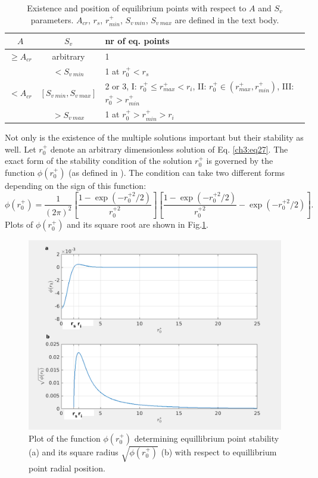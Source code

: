 \documentclass[../main.tex]{subfiles}
\begin{document}
\begin{table}
\small
\tabcolsep=0.2cm
\caption{Existence and position of equilibrium points with respect to $A$ and $S_v$ parameters. $A_{cr}$, $r_s$, $r^+_{min}$, $S_{v\ min}$, $S_{v\ max}$ are defined in the text body.}
\centering
\begin{tabular}{|c|c|l|}
\hline
$A$ & $S_v$ & nr  of eq. points\\
\hline
$\geq A_{cr}$ & arbitrary & 1 \\
\hline
\multirow{3}{*}{$<A_{cr}$} & $<S_{v\ min}$ & 1 at $r^+_0 <r_s$ \\
\multirow{3}{*}{\ } & $[S_{v\ min},S_{v\ max}]$  & 2 or 3, I: $r^+_0\leq r^+_{max}<r_i$, II: $r^+_0 \in (r^+_{max},r^+_{min})$, III: $r^+_0>r^+_{min}$\\
\multirow{3}{*}{\ } & $>S_{v\ max}$  & 1 at $r^+_0>r^+_{min}>r_i$\\
\hline
\end{tabular}
\label{tab:ch3_2b}
\end{table}

Not only is the existence of the multiple solutions important but their stability as well. Let $r^+_0$ denote an arbitrary dimensionless solution of Eq. \ref{ch3:eq27}. The exact form of the stability condition of the solution $r^+_0$ is governed by the function $\phi(r^+_0)$ (as defined in \citet{Marcu1995}). The condition can take two different forms depending on the sign of this function:
\begin{equation}
\phi(r^+_0)=\frac{1}{(2 \pi)^2} \left[\frac{1-\exp(-r^{+ 2}_0/2)}{r^{+ 2}_0} \right] \left[\frac{1-\exp(-r^{+ 2}_0/2)}{r^{+ 2}_0}-\exp(-r^{+ 2}_0/2) \right].
\label{ch3:eq29}
\end{equation}
Plots of $\phi(r^+_0)$ and its square root are shown in Fig.\ref{fig:ch3_7}.

\begin{figure}
\centering
\noindent \includegraphics[width=30pc]{gfx/stability_functions.png}
\caption{Plot of the function $\phi(r^+_0)$ determining equillibrium point stability (a) and its square radius $\sqrt{\phi(r^+_0)}$ (b) with respect to equillibrium point radial position.}
\label{fig:ch3_7}
\end{figure}
\end{document}
